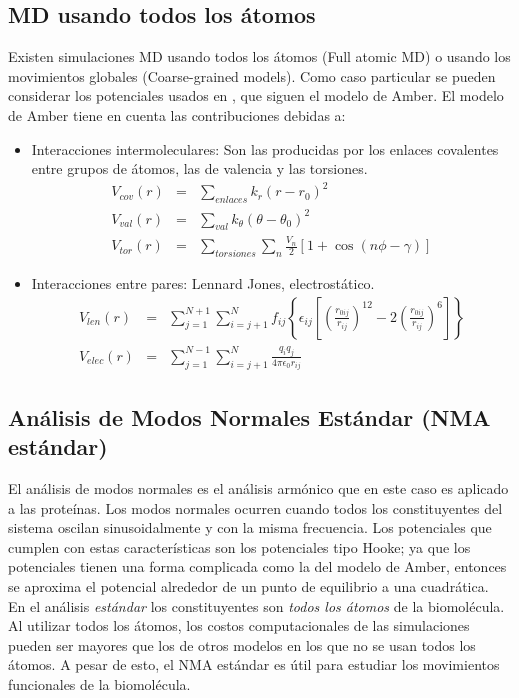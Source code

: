 \subsection{MD usando todos los \'{a}tomos}
Existen simulaciones MD usando todos los \'{a}tomos (Full atomic MD) o usando los movimientos globales (Coarse-grained models). Como caso particular se pueden considerar los potenciales usados en \cite{Amber2016}, que siguen el modelo de Amber. El modelo de Amber tiene en cuenta las contribuciones debidas a:
 \begin{itemize}
\item Interacciones intermoleculares: Son las producidas por los enlaces covalentes entre grupos de \'{a}tomos, las de valencia y las torsiones.
\begin{eqnarray}
V_{cov}(r)&=&\sum_{enlaces}k_r\left(r-r_0\right)^2\\
V_{val}(r)&=&\sum_{val}k_\theta\left(\theta-\theta_0\right)^2\\
V_{tor}(r)&=&\sum_{torsiones}\sum_{n}\frac{V_n}{2}\left[1+\cos(n\phi-\gamma)\right]
\end{eqnarray}
\item Interacciones entre pares: Lennard Jones, electrost\'{a}tico.
\begin{eqnarray}
V_{len}(r)&=&\sum_{j=1}^{N+1}\sum_{i=j+1}^N f_{ij}\left\{\epsilon_{ij}\left[\left(\frac{r_{0ij}}{r_{ij}}\right)^{12}-2\left(\frac{r_{0ij}}{r_{ij}}\right)^6\right]\right\}\\
V_{elec}(r)&=&\sum_{j=1}^{N-1}\sum_{i=j+1}^{N}\frac{q_iq_j}{4\pi\epsilon_0r_{ij}}
\end{eqnarray}
\end{itemize}
\subsection{An\'{a}lisis de Modos Normales Est\'{a}ndar (NMA est\'{a}ndar)}

El an\'{a}lisis de modos normales es el an\'{a}lisis arm\'{o}nico que en este caso es aplicado a las prote\'{i}nas. Los modos normales ocurren cuando todos los constituyentes del sistema oscilan sinusoidalmente y con la misma frecuencia. Los potenciales que cumplen con estas caracter\'{i}sticas son los potenciales tipo Hooke; ya que los potenciales tienen una forma complicada como la del modelo de Amber, entonces se aproxima el potencial alrededor de un punto de equilibrio a una cuadr\'{a}tica.\\

En el an\'{a}lisis \textit{est\'{a}ndar} los constituyentes son \textit{todos los \'{a}tomos} de la biomol\'{e}cula. Al utilizar todos los \'{a}tomos, los costos computacionales de las simulaciones pueden ser mayores que los de otros modelos en los que no se usan todos los \'{a}tomos. A pesar de esto, el NMA est\'{a}ndar es \'{u}til para estudiar los movimientos funcionales de la biomol\'{e}cula.\\

